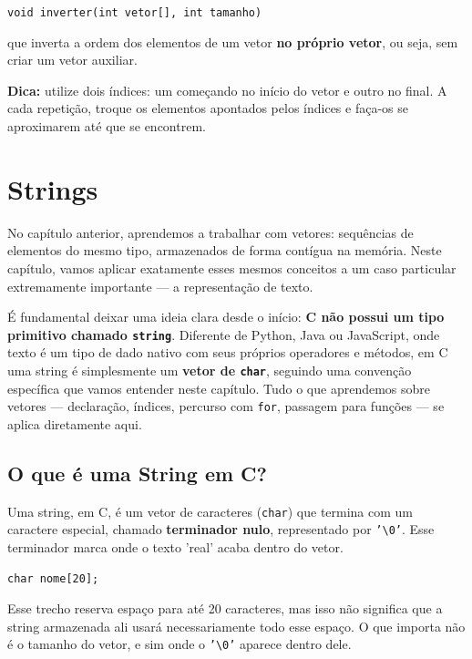 \documentclass[12pt,a4paper,oneside]{extreport}
\begin{document}
\begin{exercicio}
\begin{center}
\texttt{void inverter(int vetor[], int tamanho)}
\end{center}

que inverta a ordem dos elementos de um vetor \textbf{no próprio vetor}, ou seja, sem criar um vetor auxiliar.

\textbf{Dica:} utilize dois índices: um começando no início do vetor e outro no final. A cada repetição, troque os elementos apontados pelos índices e faça-os se aproximarem até que se encontrem.

\end{exercicio}


\chapter{Strings}
No capítulo anterior, aprendemos a trabalhar com vetores: sequências de elementos do mesmo tipo, armazenados de forma contígua na memória. Neste capítulo, vamos aplicar exatamente esses mesmos conceitos a um caso particular extremamente importante — a representação de texto.

É fundamental deixar uma ideia clara desde o início: \textbf{C não possui um tipo primitivo chamado \texttt{string}}. Diferente de Python, Java ou JavaScript, onde texto é um tipo de dado nativo com seus próprios operadores e métodos, em C uma string é simplesmente um \textbf{vetor de \texttt{char}}, seguindo uma convenção específica que vamos entender neste capítulo. Tudo o que aprendemos sobre vetores — declaração, índices, percurso com \texttt{for}, passagem para funções — se aplica diretamente aqui.

\section{O que é uma String em C?}
\label{sec:string-conceito}

Uma string, em C, é um vetor de caracteres (\texttt{char}) que termina com um caractere especial, chamado \textbf{terminador nulo}, representado por \texttt{'\textbackslash 0'}. Esse terminador marca onde o texto 'real' acaba dentro do vetor.

\begin{lstlisting}
char nome[20];
\end{lstlisting}

Esse trecho reserva espaço para até 20 caracteres, mas isso não significa que a string armazenada ali usará necessariamente todo esse espaço. O que importa não é o tamanho do vetor, e sim onde o \texttt{'\textbackslash 0'} aparece dentro dele.
\end{document}
